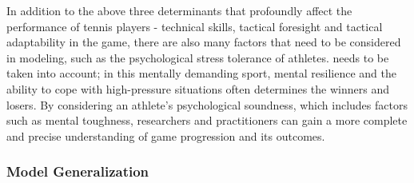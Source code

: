 In addition to the above three determinants that profoundly affect the performance of tennis players - technical skills, tactical foresight and tactical adaptability in the game, there are also many factors that need to be considered in modeling, such as the psychological stress tolerance of athletes. needs to be taken into account; in this mentally demanding sport, mental resilience and the ability to cope with high-pressure situations often determines the winners and losers. By considering an athlete's psychological soundness, which includes factors such as mental toughness, researchers and practitioners can gain a more complete and precise understanding of game progression and its outcomes.

\subsubsection{Model Generalization}
